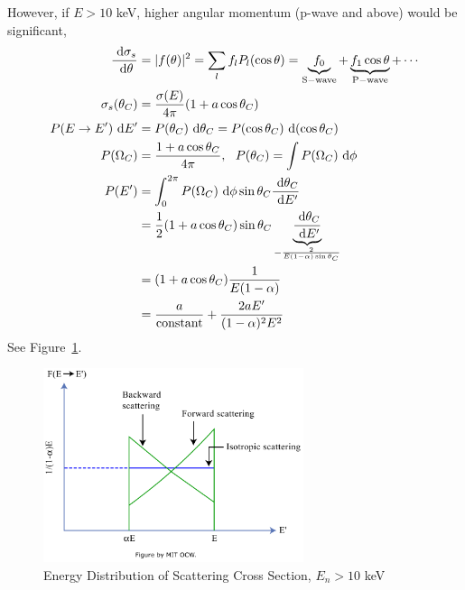 \documentclass{school-22.101-notes}
\begin{document}
\begin{enumerate}
However, if $E > 10$ keV, higher angular momentum (p-wave and above) would be significant, 
\begin{align}
\frac{\mbox{ }\mathrm{d}\sigma_s}{\mbox{ }\mathrm{d} \theta} &= |f(\theta)|^2 = \displaystyle\sum_l f_l P_l(\cos \theta)  = \underbrace{f_0}_{\mathrm{S-wave}} + \underbrace{f_1 \cos \theta}_{\mathrm{P-wave}} + \cdots \\
\sigma_s (\theta_C) &= \frac{\sigma (E)}{4 \pi} ( 1 + a \cos \theta_C) \\
P(E \to E^{\prime}) \mbox{ }\mathrm{d} E^{\prime} &= P(\theta_C) \mbox{ }\mathrm{d} \theta_C = P(\cos \theta_C) \mbox{ }\mathrm{d} (\cos \theta_C) \\
P(\Omega_C) &= \frac{1 + a \cos \theta_C}{4 \pi}, \mbox{ } \mbox{ } P(\theta_C) = \int P(\Omega_C) \mbox{ }\mathrm{d} \phi \\
P(E^{\prime}) &= \int_0^{2\pi} P(\Omega_C) \mbox{ }\mathrm{d} \phi \sin \theta_C \frac{\mbox{ }\mathrm{d} \theta_C}{\mbox{ }\mathrm{d} E^{\prime}} \\
&= \frac{1}{2} (1 + a \cos \theta_C) \sin \theta_C \underbrace{\frac{\mbox{ }\mathrm{d} \theta_C}{\mbox{ }\mathrm{d} E^{\prime}}}_{- \frac{2}{E(1-\alpha) \sin \theta_C}} \\
&= (1 + a \cos \theta_C) \frac{1}{E(1-\alpha)} \\
&= \frac{a}{\mbox{constant}} + \frac{2 a E^{\prime}}{(1-\alpha)^2 E^2}
\end{align}
See Figure~\ref{p-wave-approx}.
\begin{figure}
    \centering
    \includegraphics[width=3in]{images/ni/p-wave-approx.png}
    \caption{Energy Distribution of Scattering Cross Section, $E_n > 10$ keV\label{p-wave-approx}}
\end{figure}
\end{enumerate}
\end{document}
